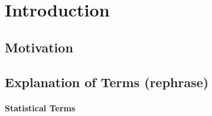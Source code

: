 \chapter{Introduction}

\section{Motivation}
\section{Explanation of Terms (rephrase)}
\subsubsection{Statistical Terms}

